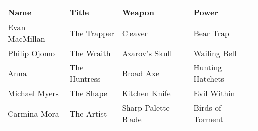 \begin{tabular}{llll}
\toprule
          Name &        Title &              Weapon &            Power \\
\midrule
Evan MacMillan &  The Trapper &             Cleaver &        Bear Trap \\
  Philip Ojomo &   The Wraith &      Azarov's Skull &     Wailing Bell \\
          Anna & The Huntress &           Broad Axe & Hunting Hatchets \\
 Michael Myers &    The Shape &       Kitchen Knife &      Evil Within \\
  Carmina Mora &   The Artist & Sharp Palette Blade & Birds of Torment \\
\bottomrule
\end{tabular}
